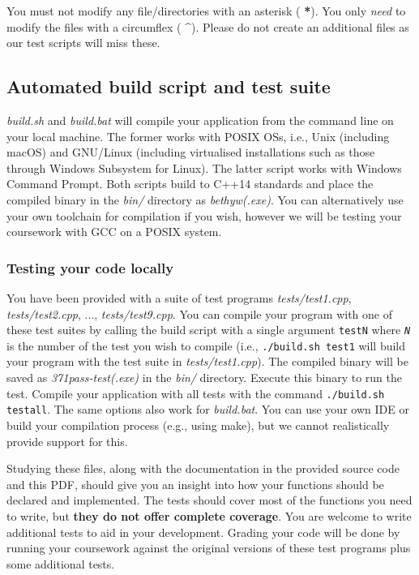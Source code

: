 \documentclass[a4paper]{article}
\begin{document}
\vspace{.5cm}
You must not modify any file/directories with an asterisk (\textbf{\color{red} *}). You only \emph{need} to modify the files with a circumflex (\textbf{\color{blue} \^{}}). Please do not create an additional files as our test scripts will miss these.


\subsection*{Automated build script and test suite}\label{sec:cwk scripts}

\emph{build.sh} and \emph{build.bat} will compile your application from the command line on your local machine. The former works with POSIX OSs, i.e., Unix (including macOS) and GNU/Linux (including virtualised installations such as those through Windows Subsystem for Linux). The latter script works with Windows Command Prompt. Both scripts build to C++14 standards and place the compiled binary in the \emph{bin/} directory as \emph{bethyw(.exe)}. You can alternatively use your own toolchain for compilation if you wish, however we will be testing your coursework with GCC on a POSIX system.

\subsubsection*{Testing your code locally}
You have been provided with a suite of test programs \emph{tests/test1.cpp}, \emph{tests/test2.cpp}, ..., \emph{tests/test9.cpp}. You can compile your program with one of these test suites by calling the build script with a single argument \texttt{testN} where \emph{\texttt{N}} is the number of the test you wish to compile (i.e., \texttt{./build.sh test1} will build your program with the test suite in \emph{tests/test1.cpp}). The compiled binary will be saved as \emph{371pass-test(.exe)} in the \emph{bin/} directory. Execute this binary to run the test. Compile your application with all tests with the command \texttt{./build.sh testall}. The same options also work for \emph{build.bat}. You can use your own IDE or build your compilation process (e.g., using make), but we cannot realistically provide support for this.

Studying these files, along with the documentation in the provided source code and this PDF, should give you an insight into how your functions should be declared and implemented. The tests should cover most of the functions you need to write, but \textbf{they do not offer complete coverage}. You are welcome to write additional tests to aid in your development. Grading your code will be done by running your coursework against the original versions of these test programs plus some additional tests.
\end{document}
